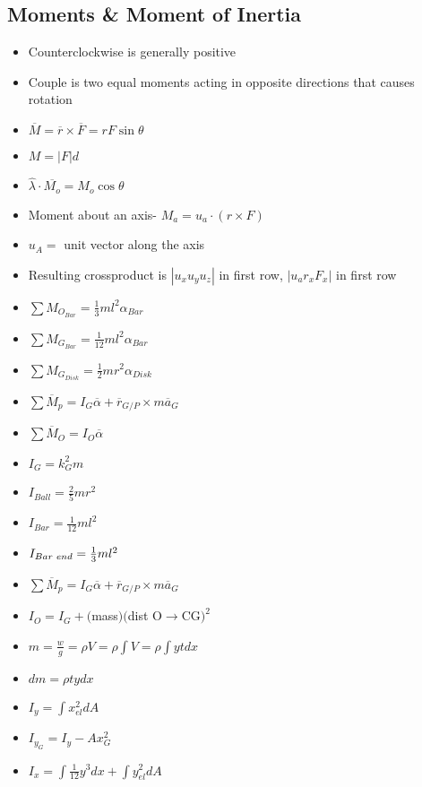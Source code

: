 \documentclass [10pt] {article}
\begin{document}
\begin{multicols*}{2}
\section{Moments \& Moment of Inertia}
	\begin{itemize}
		\item Counterclockwise is generally positive 
		\item Couple is two equal moments acting in opposite directions that causes rotation
		\item $\overline{M} = \overline{r} \times \overline{F} = rF\sin{\theta} $
		\item $M = |F|d $
		\item $\hat{\lambda} \cdot \overline{M_o} = M_o\cos\theta $ 
		\item Moment about an axis- $ M_a = u_a \cdot (r \times F)$
		\item $u_A = $ unit vector along the axis 
		\item Resulting crossproduct is $|u_x u_y u_z|$ in first row, $|u_a r_x F_x|$ in first row 
		\item $\sum M_{O_{Bar}} = \frac{1}{3}ml^2\alpha_{Bar} $
		\item $\sum M_{G_{Bar}} = \frac{1}{12}ml^2\alpha_{Bar} $
		\item $\sum M_{G_{Disk}} = \frac{1}{2}mr^2\alpha_{Disk} $
		\item $\sum \overline{M}_p = I_G\overline{\alpha} + \overline{r}_{G/P}\times m\overline{a}_G $
		\item $\sum \overline{M}_O = I_O \overline{\alpha} $\
		\item $I_G = k_G^2m $
		\item $I_{Ball} = \frac{2}{5}mr^2  $
		\item $I_{Bar} = \frac{1}{12}ml^2 $
		\item $I_{Bar \hspace{1mm} end}= \frac{1}{3}ml^2 $
		\item $\sum \overline{M}_p = I_G\overline{\alpha} + \overline{r}_{G/P} \times m\overline{a}_G$ 
		\item $I_O = I_G + ($mass$)($dist O$\rightarrow$CG$)^2$
		\item $m = \frac{w}{g} = \rho V = \rho \int V = \rho \int ytdx$
		\item $dm = \rho tydx$
		\item $I_y  = \int x^2_{el} dA $
		\item $I_{y_G} = I_y - Ax_G^2 $
		\item $I_x = \int\frac{1}{12}y^3dx + \int y^2_{el}dA $

\end{itemize}
\end{multicols*}
\end{document}
